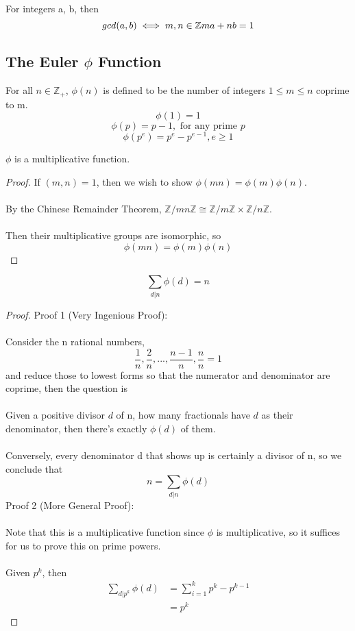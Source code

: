 \begin{theorem}
For integers a, b, then
\[gcd(a, b) \iff m,n \in \mathbb{Z} ma + nb = 1\]
\end{theorem}

\subsection{The Euler $\phi$ Function}
\begin{definition}
For all $n \in \mathbb{Z}_+$, $\phi(n)$ is defined to be the number of integers $1 \leq m \leq n$ coprime to m.
\[\phi(1) = 1\]
\[\phi(p) = p - 1, \text{ for any prime } p\]
\[\phi(p^e) = p^e - p^{e-1}, e \geq 1\]
\end{definition}

\begin{theorem}
$\phi$ is a multiplicative function.
\end{theorem}

\begin{proof}
If $(m, n) = 1$, then we wish to show $\phi(mn) = \phi(m)\phi(n)$.\\\\
By the Chinese Remainder Theorem, $\mathbb{Z}/mn\mathbb{Z} \cong \mathbb{Z}/m\mathbb{Z} \times \mathbb{Z}/n\mathbb{Z}$.\\\\
Then their multiplicative groups are isomorphic, so
\[\phi(mn) = \phi(m)\phi(n)\]
\end{proof}

\begin{theorem}
\[\sum_{d | n} \phi(d) = n\]
\end{theorem}

\begin{proof}
Proof 1 (Very Ingenious Proof):\\\\
Consider the n rational numbers,
\[\frac{1}{n}, \frac{2}{n}, ..., \frac{n-1}{n}, \frac{n}{n} = 1\]
and reduce those to lowest forms so that the numerator and denominator are coprime, then the question is\\\\
Given a positive divisor $d$ of n, how many fractionals have $d$ as their denominator, then there's exactly $\phi(d)$ of them.\\\\
Conversely, every denominator d that shows up is certainly a divisor of n, so we conclude that
\[n = \sum_{d | n} \phi(d)\]
Proof 2 (More General Proof):\\\\
Note that this is a multiplicative function since $\phi$ is multiplicative, so it suffices for us to prove this on prime powers.\\\\
Given $p^k$, then
\begin{align*}
    \sum_{d | p^k} \phi(d) &= \sum_{i = 1}^k p^k - p^{k-1}\\
    &= p^k \tag*{Telescope Sum}
\end{align*}
\end{proof}